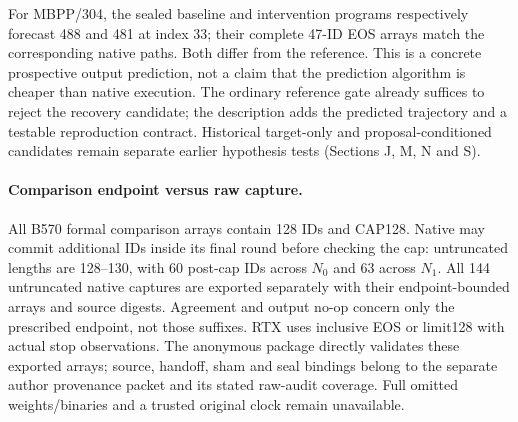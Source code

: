 For MBPP/304, the sealed baseline and intervention programs respectively forecast 488 and 481 at index 33; their complete 47-ID EOS arrays match the corresponding native paths. Both differ from the reference. This is a concrete prospective output prediction, not a claim that the prediction algorithm is cheaper than native execution. The ordinary reference gate already suffices to reject the recovery candidate; the description adds the predicted trajectory and a testable reproduction contract. Historical target-only and proposal-conditioned candidates remain separate earlier hypothesis tests (Sections J, M, N and S).

\paragraph{Comparison endpoint versus raw capture.}
All B570 formal comparison arrays contain 128 IDs and CAP128. Native may commit additional IDs inside its final round before checking the cap: untruncated lengths are 128--130, with 60 post-cap IDs across $N_0$ and 63 across $N_1$. All 144 untruncated native captures are exported separately with their endpoint-bounded arrays and source digests. Agreement and output no-op concern only the prescribed endpoint, not those suffixes. RTX uses inclusive EOS or limit128 with actual stop observations. The anonymous package directly validates these exported arrays; source, handoff, sham and seal bindings belong to the separate author provenance packet and its stated raw-audit coverage. Full omitted weights/binaries and a trusted original clock remain unavailable.



\onecolumn




